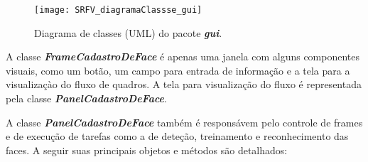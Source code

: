 \begin{figure}[h]
	\centering
	\texttt{[image: SRFV\_diagramaClassse\_gui]}
	\caption{Diagrama de classes (UML) do pacote \textbf{\textit{gui}}.}
	\label{figSRFV_diagramaClassse_gui}
\end{figure}

A classe \textbf{\textit{FrameCadastroDeFace}} é apenas uma janela com alguns componentes visuais, como um botão, um campo para entrada de informação e a tela para a visualizaçào do fluxo de quadros. A tela para visualização do fluxo é representada pela classe \textbf{\textit{PanelCadastroDeFace}}.

A classe \textbf{\textit{PanelCadastroDeFace}} também é responsávem pelo controle de frames e de execução de tarefas como a de deteção, treinamento e reconhecimento das faces. A seguir suas principais objetos e métodos são detalhados:

